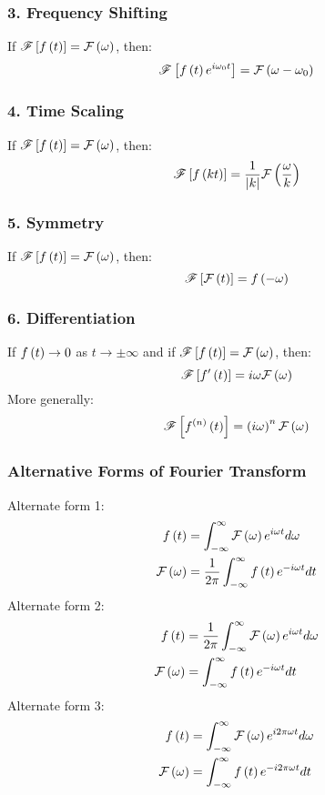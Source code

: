 \subsubsection*{3. Frequency Shifting}
If $\mathscr{F}\left[f\left(t\right)\right]=\mathcal{F}\left(\omega\right)$, then:
\begin{equation}
    \mathscr{F}\left[f\left(t\right)e^{i\omega_0t}\right]=\mathcal{F}\left(\omega-\omega_0\right)
\end{equation}
\subsubsection*{4. Time Scaling}
If $\mathscr{F}\left[f\left(t\right)\right]=\mathcal{F}\left(\omega\right)$, then:
\begin{equation}
    \mathscr{F}\left[f\left(kt\right)\right]=\frac{1}{\left|k\right|}\mathcal{F}\left(\frac{\omega}{k}\right)
\end{equation}
\subsubsection*{5. Symmetry}
If $\mathscr{F}\left[f\left(t\right)\right]=\mathcal{F}\left(\omega\right)$, then:
\begin{equation}
    \mathscr{F}\left[\mathcal{F}\left(t\right)\right]=f\left(-\omega\right)
\end{equation}
\subsubsection*{6. Differentiation}
If $f\left(t\right)\to0$ as $t\to\pm\infty$ and if $\mathscr{F}\left[f\left(t\right)\right]=\mathcal{F}\left(\omega\right)$, then:
\begin{equation*}
    \mathscr{F}\left[f'\left(t\right)\right]=i\omega\mathcal{F}\left(\omega\right)
\end{equation*}
More generally:
\begin{equation}
    \mathscr{F}\left[f^{\left(n\right)}\left(t\right)\right]=\left(i\omega\right)^n\mathcal{F}\left(\omega\right)
\end{equation}
\subsubsection{Alternative Forms of Fourier Transform}
Alternate form 1:
\begin{align}
    f\left(t\right)&=\int_{-\infty}^{\infty}\mathcal{F}\left(\omega\right)e^{i\omega t}d\omega\nonumber\\
    \mathcal{F}\left(\omega\right)&=\frac{1}{2\pi}\int_{-\infty}^{\infty}f\left(t\right)e^{-i\omega t}dt
\end{align}
Alternate form 2:
\begin{align}
        f\left(t\right)&=\frac{1}{2\pi}\int_{-\infty}^{\infty}\mathcal{F}\left(\omega\right)e^{i\omega t}d\omega\nonumber\\
        \mathcal{F}\left(\omega\right)&=\int_{-\infty}^{\infty}f\left(t\right)e^{-i\omega t}dt
\end{align}
Alternate form 3:
\begin{align}
        f\left(t\right)&=\int_{-\infty}^{\infty}\mathcal{F}\left(\omega\right)e^{i2\pi\omega t}d\omega\nonumber\\ \mathcal{F}\left(\omega\right)&=\int_{-\infty}^{\infty}f\left(t\right)e^{-i2\pi\omega t}dt
\end{align}
